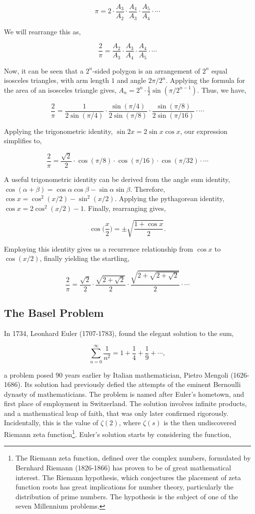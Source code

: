 \documentclass[11pt]{amsart}
\begin{document}
$$
\pi = 2 \cdot \frac{A_3}{A_2} \cdot \frac{A_4}{A_3} \cdot \frac{A_5}{A_4} \cdot \cdots
$$

We will rearrange this as,

$$
\frac{2}{\pi} = \frac{A_2}{A_3} \cdot \frac{A_3}{A_4} \cdot \frac{A_4}{A_5} \cdot \cdots
$$

Now, it can be seen that a $2^n$-sided polygon is an arrangement of $2^n$ equal isosceles triangles, with arm length $1$ and angle $2\pi/2^n$. Applying the formula for the area of an isosceles triangle gives, $A_n = 2^{n}\cdot\frac{1}{2}\sin(\pi / 2^{n-1})$. Thus, we have,

$$
\frac{2}{\pi} = \frac{1}{2\sin(\pi/4)} \cdot \frac{\sin(\pi/4)}{2\sin(\pi/8)} \cdot \frac{\sin(\pi/8)}{2\sin(\pi/16)} \cdot \cdots
$$

Applying the trigonometric identity, $\sin{2x} = 2\sin x\cos x$, our expression simplifies to,

$$
\frac{2}{\pi} = \frac{\sqrt{2}}{2} \cdot \cos(\pi/8) \cdot \cos(\pi/16) \cdot \cos(\pi/32) \cdot \cdots
$$

A useful trigonometric identity can be derived from the angle sum identity, $\cos(\alpha + \beta) = \cos\alpha\cos\beta - \sin\alpha\sin\beta$. Therefore, $\cos x = \cos^2(x/2) - \sin^2(x/2)$. Applying the pythagorean identity, $\cos x = 2\cos^2(x/2) - 1$. Finally, rearranging gives,

$$\cos \Big(\frac{x}{2}\Big) = \pm\sqrt{\frac{1 + \cos x}{2}}.$$

Employing this identity gives us a recurrence relationship from $\cos x$ to $\cos(x/2)$, finally yielding the startling,

$$
\frac{2}{\pi} = \frac{\sqrt{2}}{2} \cdot \frac{\sqrt{2 + \sqrt{2}}}{2} \cdot \frac{\sqrt{2 + \sqrt{2 + \sqrt{2}}}}{2} \cdot \cdots
$$

\subsection{The Basel Problem}
In 1734, Leonhard Euler (1707-1783), found the elegant solution to the sum,

$$\sum_{n=0}^{\infty}\frac{1}{n^2} = 1 + \frac{1}{4} + \frac{1}{9} + \cdots,$$

a problem posed 90 years earlier by Italian mathematician, Pietro Mengoli (1626-1686). Its solution had previously defied the attempts of the eminent Bernoulli dynasty of mathematicians. The problem is named after Euler's hometown, and first place of employment in Switzerland. The solution involves infinite products, and a mathematical leap of faith, that was only later confirmed rigorously. Incidentally, this is the value of $\zeta(2)$, where $\zeta(s)$ is the then undiscovered Riemann zeta function\footnote{The Riemann zeta function, defined over the complex numbers, formulated by Bernhard Riemann (1826-1866) has proven to be of great mathematical interest. The Riemann hypothesis, which conjectures the placement of zeta function roots has great implications for number theory, particularly the distribution of prime numbers. The hypothesis is the subject of one of the seven Millennium problems.}. Euler's solution starts by considering the function,
\end{document}
